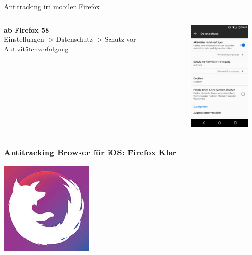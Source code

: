 \begin{frame}{Antitracking im mobilen Firefox}
	\begin{columns}
		\column{5.5cm}
		\footnotesize
		\textbf{ab Firefox 58}\\
		Einstellungen -> Datenschutz -> Schutz vor Aktivitätenverfolgung\\
		\vspace{0.5cm}

		\column{5cm}

		\begin{center}
			\includegraphics[width=3.5cm]{img/firefox-mobil-antitracking.png}
		\par\end{center}
	\end{columns}
\end{frame}

\begin{frame}
	\frametitle{Antitracking Browser für iOS: Firefox Klar}

	\begin{center}
		\includegraphics[height=0.5\textheight]{img/firefox-klar.jpg}
	\end{center}
\end{frame}

